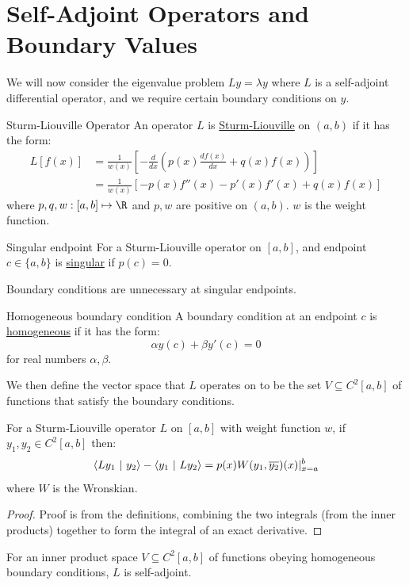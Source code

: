 \documentclass[../Main.tex]{subfiles}
\begin{document}
\section{Self-Adjoint Operators and Boundary Values}
We will now consider the eigenvalue problem $Ly = \lambda y$ where $L$ is a self-adjoint differential operator, and we require certain boundary conditions on $y$.
\begin{definition}{Sturm-Liouville Operator}
    An operator $L$ is \underline{Sturm-Liouville} on $(a, b)$ if it has the form:
    \begin{align*}
        L[f(x)] &= \frac1{w(x)} \left[-\frac{d}{dx} \left(p(x) \frac{df(x)}{dx} + q(x) f(x)\right)\right] \\
        &= \frac{1}{w(x)} \left[-p(x) f''(x) - p'(x) f'(x) + q(x) f(x)\right]
    \end{align*}
    where $p, q, w : [a, b] \mapsto \R$ and $p, w$ are positive on $(a, b)$. $w$ is the weight function.
\end{definition}
\begin{definition}{Singular endpoint}
    For a Sturm-Liouville operator on $[a, b]$, and endpoint $c \in \{a, b\}$ is \underline{singular} if $p(c) = 0$.
\end{definition}
Boundary conditions are unnecessary at singular endpoints.
\begin{definition}{Homogeneous boundary condition}
    A boundary condition at an endpoint $c$ is \underline{homogeneous} if it has the form:
    \begin{equation*}
        \alpha y(c) + \beta y'(c) = 0
    \end{equation*}
    for real numbers $\alpha, \beta$.
\end{definition}
We then define the vector space that $L$ operates on to be the set $V \subseteq C^2[a, b]$ of functions that satisfy the boundary conditions.
\begin{proposition}
    For a Sturm-Liouville operator $L$ on $[a, b]$ with weight function $w$, if $y_1, y_2 \in C^2[a, b]$ then:
    \begin{equation}
        \langle Ly_1~\vert~y_2\rangle - \langle y_1~\vert~Ly_2\rangle = p(x) W(y_1, \overline{y_2})(x)|_{x = a}^b
        \label{eqnSLAdjDifference}
    \end{equation}
    where $W$ is the Wronskian.
    \label{propSLIsSelfAdj}
\end{proposition}
\begin{proof}
    Proof is from the definitions, combining the two integrals (from the inner products) together to form the integral of an exact derivative.
\end{proof}
\begin{corollary}
    For an inner product space $V \subseteq C^2[a, b]$ of functions obeying homogeneous boundary conditions, $L$ is self-adjoint.
    \label{corSLIsSelfAdj}
\end{corollary}
\end{document}
